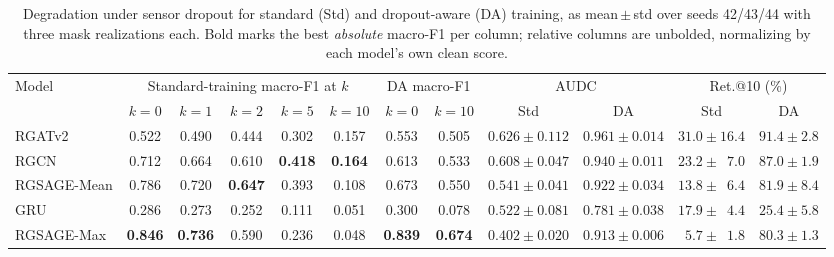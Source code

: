 \documentclass[3p,times,procedia]{elsarticle}
\begin{document}
\begin{table}[!tb]
  \centering
  \caption{Degradation under sensor dropout for standard (Std) and dropout-aware (DA)
           training, as mean\,$\pm$\,std over seeds 42/43/44 with three mask realizations
           each. Bold marks the best \emph{absolute} macro-F1 per column; relative columns
           are unbolded, normalizing by each model's own clean score.}
  \label{tab:degradation}
  \scriptsize
  \setlength{\tabcolsep}{3pt}
  \begin{tabular}{@{}lccccccccccc@{}}
    \toprule
    \multirow{2}{*}{Model}
      & \multicolumn{5}{c}{Standard-training macro-F1 at $k$}
      & \multicolumn{2}{c}{DA macro-F1}
      & \multicolumn{2}{c}{AUDC} & \multicolumn{2}{c}{Ret.@10 (\%)} \\
    \cmidrule(lr){2-6}\cmidrule(lr){7-8}\cmidrule(lr){9-10}\cmidrule(l){11-12}
      & $k{=}0$ & $k{=}1$ & $k{=}2$ & $k{=}5$ & $k{=}10$
      & $k{=}0$ & $k{=}10$
      & Std & DA & Std & DA \\
    \midrule
    RGATv2      & 0.522 & 0.490 & 0.444 & 0.302 & 0.157 & 0.553 & 0.505
                & $0.626{\pm}0.112$ & $0.961{\pm}0.014$ & $31.0{\pm}16.4$ & $91.4{\pm}2.8$ \\
    RGCN        & 0.712 & 0.664 & 0.610 & \textbf{0.418} & \textbf{0.164} & 0.613 & 0.533
                & $0.608{\pm}0.047$ & $0.940{\pm}0.011$ & $23.2{\pm}\phantom{0}7.0$ & $87.0{\pm}1.9$ \\
    RGSAGE-Mean & 0.786 & 0.720 & \textbf{0.647} & 0.393 & 0.108 & 0.673 & 0.550
                & $0.541{\pm}0.041$ & $0.922{\pm}0.034$ & $13.8{\pm}\phantom{0}6.4$ & $81.9{\pm}8.4$ \\
    GRU         & 0.286 & 0.273 & 0.252 & 0.111 & 0.051 & 0.300 & 0.078
                & $0.522{\pm}0.081$ & $0.781{\pm}0.038$ & $17.9{\pm}\phantom{0}4.4$ & $25.4{\pm}5.8$ \\
    RGSAGE-Max  & \textbf{0.846} & \textbf{0.736} & 0.590 & 0.236 & 0.048 & \textbf{0.839} & \textbf{0.674}
                & $0.402{\pm}0.020$ & $0.913{\pm}0.006$ & $\phantom{0}5.7{\pm}\phantom{0}1.8$ & $80.3{\pm}1.3$ \\
    \bottomrule
  \end{tabular}
\end{table}
\end{document}
